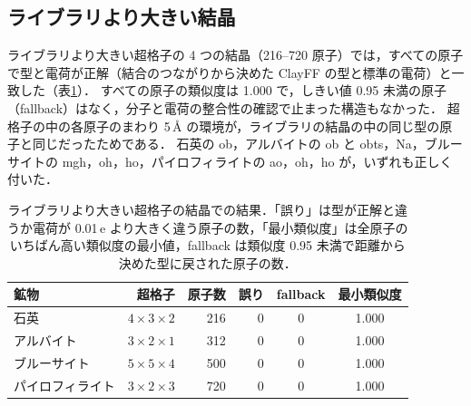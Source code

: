 \documentclass[a4paper,11pt]{article}
\newcommand{\e}{\,e}
\begin{document}
\begin{table}[!htbp]
\centering
\caption{構造ファイルから作った Na モンモリロナイトの力場の型ごとの原子数，電荷，LJ パラメータ．電荷と LJ は表\ref{tab:ffparam}の ClayFF の値で，電荷はすべての原子でライブラリのラベルと一致した．}
\label{tab:types}
\small

\end{table}

\subsection{ライブラリより大きい結晶}
ライブラリより大きい超格子の 4 つの結晶（216--720 原子）では，すべての原子で型と電荷が正解（結合のつながりから決めた ClayFF の型と標準の電荷）と一致した（表\ref{tab:bulk}）．
すべての原子の類似度は 1.000 で，しきい値 0.95 未満の原子（fallback）はなく，分子と電荷の整合性の確認で止まった構造もなかった．
超格子の中の各原子のまわり 5\,\AA{} の環境が，ライブラリの結晶の中の同じ型の原子と同じだったためである．
石英の ob，アルバイトの ob と obts，Na，ブルーサイトの mgh，oh，ho，パイロフィライトの ao，oh，ho が，いずれも正しく付いた．

\begin{table}[!htbp]
\centering
\caption{ライブラリより大きい超格子の結晶での結果．「誤り」は型が正解と違うか電荷が 0.01\e{} より大きく違う原子の数，「最小類似度」は全原子のいちばん高い類似度の最小値，fallback は類似度 0.95 未満で距離から決めた型に戻された原子の数．}
\label{tab:bulk}
\small
\begin{tabular}{lrrrcc}
\toprule
鉱物 & 超格子 & 原子数 & 誤り & fallback & 最小類似度 \\
\midrule
石英 & $4\times3\times2$ & 216 & 0 & 0 & 1.000 \\
アルバイト & $3\times2\times1$ & 312 & 0 & 0 & 1.000 \\
ブルーサイト & $5\times5\times4$ & 500 & 0 & 0 & 1.000 \\
パイロフィライト & $3\times2\times3$ & 720 & 0 & 0 & 1.000 \\
\bottomrule
\end{tabular}
\end{table}
\end{document}
